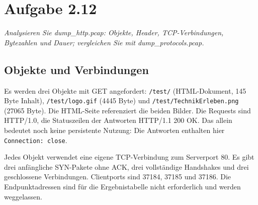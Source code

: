 \documentclass[a4paper,11pt]{article}
\newcommand{\aufgabe}[1]{\section*{Aufgabe #1}}
\newcommand{\angabe}[1]{{\raggedright\textit{#1}\par}\smallskip}
\begin{document}
\aufgabe{2.12}
\angabe{Analysieren Sie dump\_http.pcap: Objekte, Header, TCP-Verbindungen, Bytezahlen und Dauer; vergleichen Sie mit dump\_protocols.pcap.}
\subsection*{Objekte und Verbindungen}
Es werden drei Objekte mit GET angefordert: \texttt{/test/} (HTML-Dokument, 145 Byte Inhalt), \texttt{/test/logo.gif} (4445 Byte) und \texttt{/test/TechnikErleben.png} (27065 Byte). Die HTML-Seite referenziert die beiden Bilder. Die Requests sind HTTP/1.0, die Statuszeilen der Antworten HTTP/1.1 200 OK. Das allein bedeutet noch keine persistente Nutzung: Die Antworten enthalten hier \texttt{Connection: close}.

Jedes Objekt verwendet eine eigene TCP-Verbindung zum Serverport 80. Es gibt drei anfängliche SYN-Pakete ohne ACK, drei vollständige Handshakes und drei geschlossene Verbindungen. Clientports sind 37184, 37185 und 37186. Die Endpunktadressen sind für die Ergebnistabelle nicht erforderlich und werden weggelassen.
\end{document}
